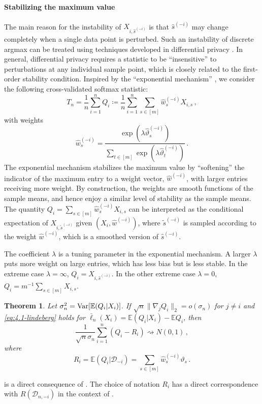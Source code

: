 \documentclass[11pt]{article}
\theoremstyle{plain}
\newtheorem{theorem}{Theorem}[section]
\newcommand{\D}{{\mathcal{D}}}
\begin{document}
\paragraph{Stabilizing the maximum value}
The main reason for the instability of $X_{i,\hat s^{(-i)}}$ is that $\hat s^{(-i)}$ may change completely when a single data point is perturbed.
Such an instability of discrete argmax can be treated using techniques developed in differential privacy \citep{dwork2014algorithmic}.  In general, differential privacy requires a statistic to be ``insensitive'' to perturbations at any individual sample point, which is closely related to the first-order stability condition.  Inspired by the ``exponential mechanism'' \citep{mcsherry2007mechanism}, we consider the following cross-validated softmax statistic:
\begin{equation}
    \label{eq:5.3-T-split-exp}
    T_n=\frac{1}{n}\sum_{i=1}^n Q_i\coloneqq \frac{1}{n}\sum_{i=1}^n \sum_{s\in[m]} \hat w_s^{(-i)} X_{i,s}\,,
\end{equation}
with weights
$$
\hat w_s^{(-i)} = \frac{\exp(\lambda \hat\vartheta_s^{(-i)})}{\sum_{t\in[m]}\exp(\lambda \hat\vartheta_t^{(-i)})}\,.
$$
The exponential mechanism stabilizes the maximum value by ``softening'' the indicator of the maximum entry to a weight vector, $\hat w^{(-i)}$, with larger entries receiving more weight.  By construction, the weights are smooth functions of the sample means, and hence enjoy a similar level of stability as the sample means. 
The quantity $Q_i=\sum_{s\in[m]}\hat w_s^{(-i)}X_{i,s}$ can be interpreted as the conditional expectation of $X_{i,\tilde s^{(-i)}}$  given $(X_i,\hat w^{(-i)})$, where  $\tilde s^{(-i)}$ is sampled according to the weight $\hat w^{(-i)}$, which is a smoothed version of $\hat s^{(-i)}$.

The coefficient $\lambda$ is a tuning parameter in the exponential mechanism. A larger $\lambda$ puts more weight on large entries, which has less bias but is less stable. In the extreme case $\lambda=\infty$, $Q_i=X_{i,\hat s^{(-i)}}$.  In the other extreme case $\lambda=0$, $Q_i=m^{-1}\sum_{s\in[m]}X_{i,s}$.   

\begin{theorem}
    \label{thm:5.3-argmin-clt}
    Let $\sigma_n^2={\rm Var}[\mathbb E(Q_i|X_i)]$.
    If $\sqrt{n}\|\nabla_j Q_i\|_2 =o(\sigma_n)$ for $j\neq i$ and \eqref{eq:4.1-lindeberg} holds for $\bar\ell_n(X_i)=\mathbb E(Q_i|X_i)-\mathbb E Q_i$, then
    $$
    \frac{1}{\sqrt{n}\sigma_n}\sum_{i=1}^n(Q_i-R_i)\rightsquigarrow N(0,1)\,,
    $$
    where
    $$R_i=\mathbb E(Q_i|\D_{-i})=\sum_{s\in[m]}\hat w_s^{(-i)}\vartheta_s\,.$$
\end{theorem}
 is a direct consequence of .
The choice of notation $R_i$ has a direct correspondence with $R(\D_{n,-i})$ in the context of .   
\end{document}
